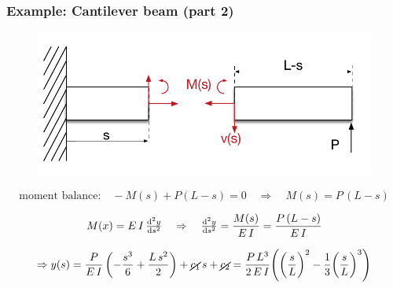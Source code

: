 \begin{frame}
  \frametitle{Example: Cantilever beam (part 2)}
  
  \begin{figure}
    \centering
    \includegraphics[width=14cm, keepaspectratio=true]{sections/traditional_beams/images/EulerCanitleverExample1part2}
  \end{figure} 
  \vspace{-1.4em}
  
  \begin{displaymath}
  \text{moment balance:} \quad  -M(s) + P(L-s) = 0 \quad \Rightarrow \quad M(s) = P \, (L-s)
  \end{displaymath}
  
  \begin{displaymath}
    M(x) = E \, I \, \od[2]{y}{s} \quad \Rightarrow \quad \od[2]{y}{s} = \frac{M(s)}{E \, I}  = \frac{P \, (L-s)}{E \, I}
  \end{displaymath}
  
  \begin{displaymath}
    \Rightarrow y(s) = \frac{P}{E \, I} \, \biggl( - \frac{s^3}{6} + \frac{L \, s^2}{2} \biggr) + \cancel{c_1} \,s + \cancel{c_2} = \frac{P \, L^3}{2 \, E \, I} \Biggl( \biggl( \frac{s}{L} \biggr)^2 - \frac{1}{3} \biggl( \frac{s}{L} \biggr)^3 \Biggr)
  \end{displaymath}
\end{frame}

